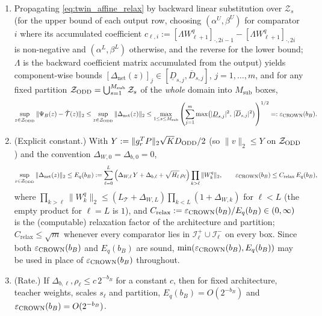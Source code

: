 \begin{proposition}
\begin{enumerate}
\item[(ii)] Propagating \eqref{eq:twin_affine_relax} by backward linear substitution over \(\mathcal{Z}_s\) (for the upper bound of each output row, choosing \((\alpha^U, \beta^U)\) for comparator \(i\) where its accumulated coefficient \(c_{\ell,i} := [\Lambda W^q_{\ell+1}]_{\cdot,2i-1} - [\Lambda W^q_{\ell+1}]_{\cdot,2i}\) is non-negative and \((\alpha^L,\beta^L)\) otherwise, and the reverse for the lower bound; \(\Lambda\) is the backward coefficient matrix accumulated from the output) yields component-wise bounds \([\Delta_{\mathrm{net}}(z)]_j \in [\underline{D}_{s,j}, \overline{D}_{s,j}]\), \(j = 1,\dots,m\), and for any fixed partition \(\mathcal{Z}_{\mathrm{ODD}} = \bigcup_{s=1}^{M_{\mathrm{sub}}} \mathcal{Z}_s\) of the \emph{whole} domain into \(M_{\mathrm{sub}}\) boxes,
\begin{equation}
\label{eq:twin_crown_bound}
\sup_{z \in \mathcal{Z}_{\mathrm{ODD}}} \|\Psi_B(z) - \hat{\mathcal{T}}(z)\|_2 \le \sup_{z \in \mathcal{Z}_{\mathrm{ODD}}} \|\Delta_{\mathrm{net}}(z)\|_2 \le \max_{1 \le s \le M_{\mathrm{sub}}} \left( \sum_{j=1}^m \max\!\big(|\underline{D}_{s,j}|^2,\, |\overline{D}_{s,j}|^2\big) \right)^{1/2} =: \varepsilon_{\mathrm{CROWN}}(b_B) .
\end{equation}
\item[(iii)] (Explicit constant.) With \(Y := \|g_r^TP\|_2\sqrt{K}D_{\mathrm{ODD}}/2\) (so \(\|v\|_2 \le Y\) on \(\mathcal{Z}_{\mathrm{ODD}}\)) and the convention \(\Delta_{W,0} = \Delta_{b,0} = 0\),
\begin{equation}
\label{eq:crown_explicit}
\sup_{z \in \mathcal{Z}_{\mathrm{ODD}}}\|\Delta_{\mathrm{net}}(z)\|_2 \le E_q(b_B) := \sum_{\ell=0}^{L}\Big(\Delta_{W,\ell}\,Y + \Delta_{b,\ell} + \sqrt{H_\ell}\,\rho_\ell\Big)\prod_{k>\ell}\|W_k^q\|_2,
\qquad
\varepsilon_{\mathrm{CROWN}}(b_B) \le C_{\mathrm{relax}}\,E_q(b_B),
\end{equation}
where \(\prod_{k>\ell}\|W_k^q\|_2 \le (L_{\mathcal{T}} + \Delta_{W,L})\prod_{k<L}(1 + \Delta_{W,k})\) for \(\ell < L\) (the empty product for \(\ell = L\) is \(1\)), and \(C_{\mathrm{relax}} := \varepsilon_{\mathrm{CROWN}}(b_B)/E_q(b_B) \in (0,\infty)\) is the (computable) relaxation factor of the architecture and partition; \(C_{\mathrm{relax}} \le \sqrt{m}\) whenever every comparator lies in \(\mathcal{I}^+_\ell \cup \mathcal{I}^-_\ell\) on every box. Since both \(\varepsilon_{\mathrm{CROWN}}(b_B)\) and \(E_q(b_B)\) are sound, \(\min(\varepsilon_{\mathrm{CROWN}}(b_B), E_q(b_B))\) may be used in place of \(\varepsilon_{\mathrm{CROWN}}(b_B)\) throughout.
\item[(iv)] (Rate.) If \(\Delta_{b,\ell}, \rho_\ell \le c\,2^{-b_B}\) for a constant \(c\), then for fixed architecture, teacher weights, scales \(s_\ell\) and partition, \(E_q(b_B) = O(2^{-b_B})\) and \(\varepsilon_{\mathrm{CROWN}}(b_B) = O(2^{-b_B})\).
\end{enumerate}
\end{proposition}

